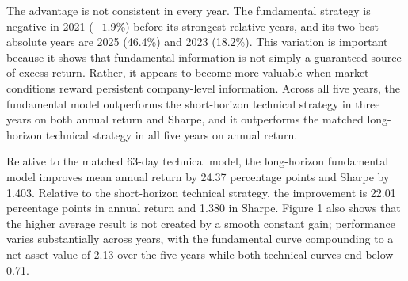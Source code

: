 \documentclass[12pt]{article}
\begin{document}
The advantage is not consistent in every year. The fundamental strategy is negative in 2021 ($-1.9\%$) before its strongest relative years, and its two best absolute years are 2025 (46.4\%) and 2023 (18.2\%). This variation is important because it shows that fundamental information is not simply a guaranteed source of excess return. Rather, it appears to become more valuable when market conditions reward persistent company-level information. Across all five years, the fundamental model outperforms the short-horizon technical strategy in three years on both annual return and Sharpe, and it outperforms the matched long-horizon technical strategy in all five years on annual return.

Relative to the matched 63-day technical model, the long-horizon fundamental model improves mean annual return by 24.37 percentage points and Sharpe by 1.403. Relative to the short-horizon technical strategy, the improvement is 22.01 percentage points in annual return and 1.380 in Sharpe. Figure 1 also shows that the higher average result is not created by a smooth constant gain; performance varies substantially across years, with the fundamental curve compounding to a net asset value of 2.13 over the five years while both technical curves end below 0.71.
\end{document}
